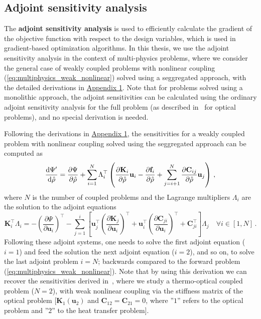     \subsection*{Adjoint sensitivity analysis}

    The \textbf{adjoint sensitivity analysis} is used to efficiently calculate the gradient
    of the objective function with
    respect to the design variables, which is used in gradient-based optimization algorithms. 
    In this thesis, we use the adjoint sensitivity
    analysis  in the context of
    multi-physics problems, where we consider the general case of weakly coupled problems with
    nonlinear coupling (\eqref{eq:multiphysics_weak_nonlinear}) solved using a seggregated approach, with the detailed derivations in 
    \hyperref[app:appendix1]{Appendix 1}. Note that for problems 
    solved using a monolithic approach, the adjoint sensitivities can be calculated using the
    ordinary adjoint sensitivity analysis for the full problem (as described in~\cite{jensen_review} for optical problems), and no special derivation is needed.

    Following the derivations in \hyperref[app:appendix1]{Appendix 1}, the sensitivities for a weakly coupled problem with nonlinear coupling solved using the seggregated
    approach can be computed as
    \begin{equation}
        \frac{\mathop{}\!\text{d} \Psi^\prime}{\mathop{}\!\text{d} \hat{\rho}}  = \frac{\partial \Psi}{\partial \hat{\rho}} + \sum^N_{i=1} \Lambda_{i}^{\top} \left( \frac{\partial \mathbf{K}_i}{\partial \hat{\rho}} \mathbf{u}_i - \frac{\partial \mathbf{f}_i}{\partial \hat{\rho}} + \sum^N_{j=i+1} \frac{\partial \mathbf{C}_{ij}}{\partial \hat{\rho}} \mathbf{u}_j \right)\,,
    \end{equation}
    where $N$ is the number of coupled problems and the Lagrange multipliers $\Lambda_i$ are the solution to the adjoint equations
    \begin{equation}
        \mathbf{K}^\top_i \Lambda_i = -\left(\frac{\partial \Psi}{\partial \mathbf{u}_i}\right)^\top - \sum_{j=1}^{i} \left[ 
        \mathbf{u}^\top_j \left(\frac{\partial \mathbf{K}_j}{\partial \mathbf{u}_i}\right)^\top  + \mathbf{u}^\top_i \left(\frac{\partial \mathbf{C}_{ji}}{\partial \mathbf{u}_i}\right)^\top + \mathbf{C}^\top_{ji} \right]\Lambda_j  \quad \forall i \in [1, N] \,.
   \end{equation}
    Following these adjoint systems, one needs to solve the first adjoint equation ($i=1$) 
    and feed the solution the next adjoint equation ($i=2$), and so on, to solve the last adjoint problem $i=N$; backwards compared to the forward problem (\eqref{eq:multiphysics_weak_nonlinear}).
    Note that by using this derivation we can recover the sensitivities derived in~\cite{ownpub0}, where we study a thermo-optical coupled problem ($N=2$), with weak nonlinear coupling
    via the stiffness matrix of the optical problem [$\mathbf{K}_1(\mathbf{u}_2)$ and $\mathbf{C}_{12}=\mathbf{C}_{21}=0$, where ''$1$'' refers to the optical problem and ''$2$'' to the 
    heat transfer problem].
    
